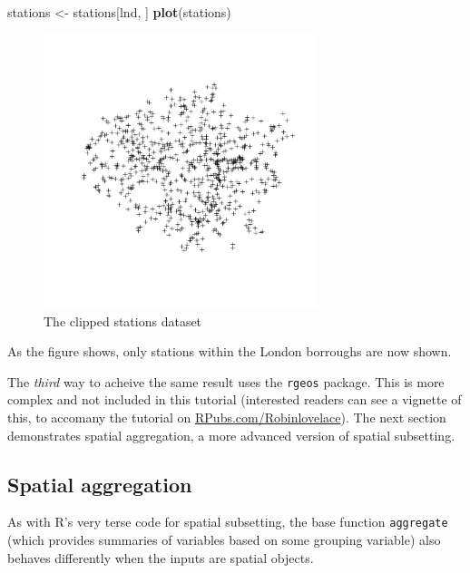 \documentclass[]{article}
\newenvironment{Shaded}{}{}
\newcommand{\KeywordTok}[1]{\textcolor[rgb]{0.00,0.44,0.13}{\textbf{{#1}}}}
\newcommand{\NormalTok}[1]{{#1}}
\let\Oldincludegraphics\includegraphics
\renewcommand{\includegraphics}[1]{\Oldincludegraphics[width=8cm]{#1}}
\begin{document}
\begin{Shaded}
\begin{Highlighting}[]
\NormalTok{stations <- stations[lnd, ]}
\KeywordTok{plot}\NormalTok{(stations)}
\end{Highlighting}
\end{Shaded}
\begin{figure}[htbp]
\centering
\includegraphics{figure/The_clipped_stations_dataset.png}
\caption{The clipped stations dataset}
\end{figure}

As the figure shows, only stations within the London borroughs are now
shown.

The \emph{third} way to acheive the same result uses the \texttt{rgeos}
package. This is more complex and not included in this tutorial
(interested readers can see a vignette of this, to accomany the tutorial
on
\href{http://rpubs.com/RobinLovelace/11796}{RPubs.com/Robinlovelace}).
The next section demonstrates spatial aggregation, a more advanced
version of spatial subsetting.

\subsection{Spatial aggregation}

As with R's very terse code for spatial subsetting, the base function
\texttt{aggregate} (which provides summaries of variables based on some
grouping variable) also behaves differently when the inputs are spatial
objects.
\end{document}
